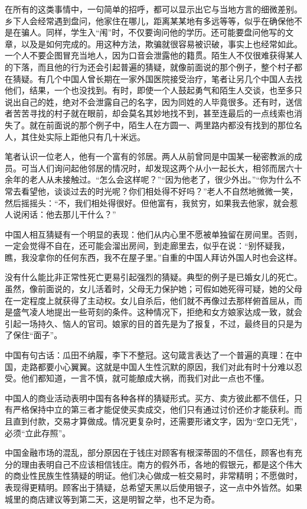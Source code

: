 \documentclass[12pt,oneside]{book}
\begin{document}
\begin{common-format}
在所有的这类事情中，一句简单的招呼，都可以显示出它与当地方言的细微差别。乡下人会经常遇到盘问，他家住在哪儿，距离某某地有多远等等，似乎在确保他不是在骗人。同样，学生入“闱”时，不仅要询问他的学历。还可能要盘问他写的文章，以及是如何完成的。用这种方法，欺骗就很容易被识破，事实上也经常如此。一个人不要企图冒充当地人，因为口音会泄露他的籍贯。陌生人不仅很难获得某人的下落，而且他的行为还会引起普遍的猜疑，就像前面说的那个例子，整个村子都在猜疑。有几个中国人曾长期在一家外国医院接受治疗，笔者让另几个中国人去找他们，结果，一个也没找到。有时，即使一个人鼓起勇气和陌生人交谈，也至多只说出自己的姓，绝对不会泄露自己的名字，因为同姓的人毕竟很多。还有时，送信者苦苦寻找的村子就在眼前，却会莫名其妙地找不到，甚至连最后的一点线索也消失了。就在前面说的那个例子中，陌生人在方圆一、两里路内都没有找到的那位名人，其住处实际上距他只有几十米远。 

笔者认识一位老人，他有一个富有的邻居。两人从前曾同是中国某一秘密教派的成员。可当人们询问起他邻居的情况时，却发现这两个从小一起长大，相邻而居六十余年的老人从未接触过。“怎么会这样呢？”“因为他老了，很少外出。”“你为什么不常去看望他，谈谈过去的时光呢？你们相处得不好吗？”老人不自然地微微一笑，然后摇摇头：“不，我们相处得很好。但他富有，我贫穷，如果我去他家，就会惹人说闲话：他去那儿干什么？” 

中国人相互猜疑有一个明显的表现：他们从内心里不愿被单独留在房间里。否则，一定会觉得不自在，还可能会溜出房间，到走廊里去，似乎在说：“别怀疑我，瞧，我没拿你的任何东西，我不在屋子里。”自重的中国人拜访外国人时也会这样。 

没有什么能比非正常性死亡更易引起强烈的猜疑。典型的例子是已婚女儿的死亡。虽然，像前面说的，女儿活着时，父母无力保护她；可假如她死得可疑，她的父母在一定程度上就获得了主动权。女儿自杀后，他们就不再像过去那样俯首屈从，而是盛气凌人地提出一些苛刻的条件。这种情况下，拒绝和女方娘家达成一致，就会引起一场持久、恼人的官司。娘家的目的首先是为了报复，不过，最终目的只是为了保住“面子”。 

中国有句古话：瓜田不纳履，李下不整冠。这句箴言表达了一个普遍的真理：在中国，走路都要小心翼翼。这就是中国人生性沉默的原因，我们对此有时十分难以忍受。他们都知道，一言不慎，就可能酿成大祸，而我们对此一点也不懂。 

中国人的商业活动表明中国有各种各样的猜疑形式。买方、卖方彼此都不信任，只有严格保持中立的第三者才能促使买卖成交，他们只有通过讨价还价才能获利。而且直到付款，交易才算做成。情况更复杂时，还需要形诸文字，因为“空口无凭”，必须“立此存照”。 

中国金融市场的混乱，部分原因在于钱庄对顾客有根深蒂固的不信任，顾客也有充分的理由表明自己不应该相信钱庄。南方的假外币，各地的假银元，都是这个伟大的商业性民族生性猜疑的明证。他们决心做成一桩交易时，非常精明；不愿做时，表现得更精明。顾客出于猜疑，总希望天黑以后使用银子，这一点中外皆然。如果城里的商店建议等到第二天，这是明智之举，也不足为奇。 


\end{common-format}
\end{document}
